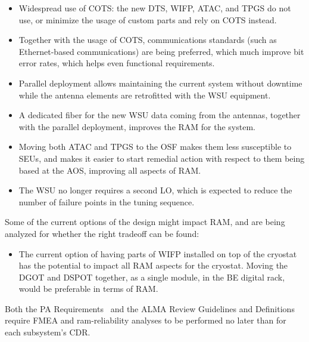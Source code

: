 \begin{itemize}[itemsep=-0.5em]
    \item Widespread use of COTS: the new \ac{DTS}, \ac{WIFP}, \ac{ATAC}, and \ac{TPGS} do not use, or minimize the usage of custom parts and rely on \ac{COTS} instead.
    \item Together with the usage of COTS, communications standards (such as Ethernet-based communications) are being preferred, which much improve bit error rates, which helps even functional requirements.
    \item Parallel deployment allows maintaining the current system without downtime while the antenna elements are retrofitted with the WSU equipment.
    \item A dedicated fiber for the new WSU data coming from the antennas, together with the parallel deployment, improves the RAM for the system.
    \item Moving both ATAC and TPGS to the \ac{OSF} makes them less susceptible to \acp{SEU}, and makes it easier to start remedial action with respect to them being based at the \ac{AOS}, improving all aspects of RAM.
    \item The WSU no longer requires a second \ac{LO}, which is expected to reduce the number of failure points in the tuning sequence.
\end{itemize}

Some of the current options of the design might impact RAM, and are being analyzed for whether the right tradeoff can be found:

\begin{itemize}[itemsep=-0.5em]
    \item The current option of having parts of \ac{WIFP} installed on top of the cryostat has the potential to impact all RAM aspects for the cryostat. Moving the \ac{DGOT} and \ac{DSPOT} together, as a single module, in the \ac{BE} digital rack, would be preferable in terms of RAM.
\end{itemize}

Both the PA Requirements~\cite{pa_req} and the ALMA Review Guidelines and Definitions~\cite{ALMA_Reviews_Definitions} require \ac{FMEA} and \ac{ram-reliability} analyses to be performed no later than for each subsystem's \ac{CDR}.

